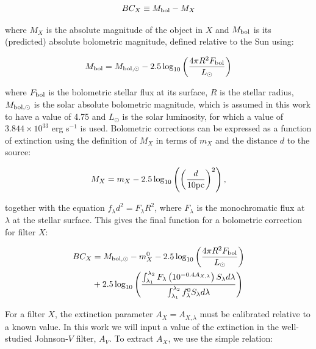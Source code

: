 \documentclass[12pt, a4paper]{report}
\begin{document}
\begin{equation}
BC_{X} \equiv M_{\textnormal{bol}} - M_{X}
\label{BC_def}
\end{equation}

where $M_{X}$ is the absolute magnitude of the object in $X$ and $M_{\textnormal{bol}}$ is its (predicted) absolute bolometric magnitude, defined relative to the Sun using:

\begin{equation}
M_{\textnormal{bol}} = M_{\textnormal{bol},\odot} - 2.5 \log_{10} \left( \frac{4\pi R^{2}F_{\textnormal{bol}}}{L_{\odot}} \right)
\label{mbol_sun}
\end{equation}

where  $F_{\textnormal{bol}}$ is the bolometric stellar flux at its surface, $R$ is the stellar radius, $M_{\textnormal{bol},\odot}$ is the solar absolute bolometric magnitude, which is assumed in this work to have a value of 4.75 and $L_{\odot}$ is the solar luminosity, for which a value of $3.844 \times 10^{33}$ erg s$^{-1}$ is used. Bolometric corrections can be expressed as a function of extinction using the definition of $M_{X}$ in terms of $m_{X}$ and the distance $d$ to the source:

\begin{equation}
M_{X} = m_{X} - 2.5 \log_{10}\left( \left( \frac{d}{10 \textnormal{pc}} \right)^{2} \right),
\label{abs_mag_def}
\end{equation}

together with the equation $f_{\lambda}d^{2}=F_{\lambda}R^{2}$, where $F_{\lambda}$ is the monochromatic flux at $\lambda$ at the stellar surface. This gives the final function for a bolometric correction for filter $X$:

\begin{align}
\begin{split}
BC_{X} &= M_{\textnormal{bol},\odot} - m_{X}^{0} - 2.5 \log_{10} \left( \frac{4\pi R^{2}F_{\textnormal{bol}}}{L_{\odot}} \right) \\
&+ 2.5 \log_{10} \left( \frac{\int_{\lambda_{1}}^{\lambda_{2}} F_{\lambda} \left( 10^{-0.4 A_{X,\lambda}} \right) S_{\lambda} d\lambda}{\int_{\lambda_{1}}^{\lambda_{2}} f_{\lambda}^{0} S_{\lambda} d\lambda} \right)
\label{BC_extinc}
\end{split}
\end{align}

For a filter $X$, the extinction parameter $A_{X} = A_{X,\lambda}$ must be calibrated relative to a known value. In this work we will input a value of the extinction in the well-studied Johnson-$V$ filter, $A_{V}$. To extract $A_{X}$, we use the simple relation:
\end{document}
